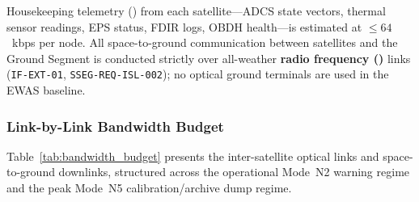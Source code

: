 Housekeeping telemetry () from each satellite---ADCS state vectors, thermal sensor readings, EPS status, FDIR logs, OBDH health---is estimated at $\le 64$~kbps per node. All space-to-ground communication between satellites and the Ground Segment is conducted strictly over all-weather \textbf{radio frequency ()} links (\texttt{IF-EXT-01}, \texttt{SSEG-REQ-ISL-002}); no optical ground terminals are used in the EWAS baseline.

\subsubsection{Link-by-Link Bandwidth Budget}

Table~\ref{tab:bandwidth_budget} presents the inter-satellite optical links and space-to-ground  downlinks, structured across the operational Mode~N2 warning regime and the peak Mode~N5 calibration/archive dump regime.

